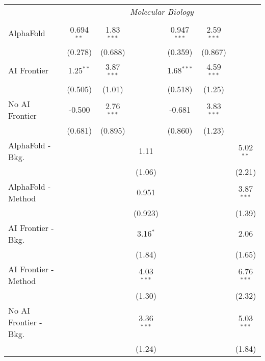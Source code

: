 \begin{tabular}{lcccccc}
 & \multicolumn{6}{c}{\textit{Molecular Biology}} \\ \\
   AlphaFold               & 0.694$^{**}$ & 1.83$^{***}$ &              & 0.947$^{***}$ & 2.59$^{***}$ &   \\   
                           & (0.278)      & (0.688)      &              & (0.359)       & (0.867)      &   \\   
   AI Frontier             & 1.25$^{**}$  & 3.87$^{***}$ &              & 1.68$^{***}$  & 4.59$^{***}$ &   \\   
                           & (0.505)      & (1.01)       &              & (0.518)       & (1.25)       &   \\   
   No AI Frontier          & -0.500       & 2.76$^{***}$ &              & -0.681        & 3.83$^{***}$ &   \\   
                           & (0.681)      & (0.895)      &              & (0.860)       & (1.23)       &   \\   
   AlphaFold - Bkg.        &              &              & 1.11         &               &              & 5.02$^{**}$\\   
                           &              &              & (1.06)       &               &              & (2.21)\\   
   AlphaFold - Method      &              &              & 0.951        &               &              & 3.87$^{***}$\\   
                           &              &              & (0.923)      &               &              & (1.39)\\   
   AI Frontier - Bkg.      &              &              & 3.16$^{*}$   &               &              & 2.06\\   
                           &              &              & (1.84)       &               &              & (1.65)\\   
   AI Frontier - Method    &              &              & 4.03$^{***}$ &               &              & 6.76$^{***}$\\   
                           &              &              & (1.30)       &               &              & (2.32)\\   
   No AI Frontier - Bkg.   &              &              & 3.36$^{***}$ &               &              & 5.03$^{***}$\\   
                           &              &              & (1.24)       &               &              & (1.84)\\   

\end{tabular}
